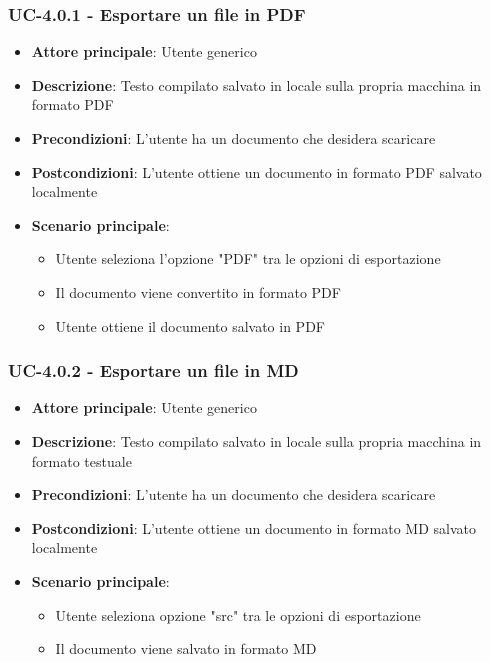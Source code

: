 \documentclass[11pt,a4paper]{article}
\begin{document}
\subsubsection{UC-4.0.1 - Esportare un file in PDF}
\begin{itemize}
    \item \textbf{Attore principale}: Utente generico
    \item \textbf{Descrizione}: Testo compilato salvato in locale sulla propria macchina in formato PDF
    \item \textbf{Precondizioni}: L'utente ha un documento che desidera scaricare
    \item \textbf{Postcondizioni}: L'utente ottiene un documento in formato PDF salvato localmente
    \item \textbf{Scenario principale}:
        \begin{itemize}
            \item Utente seleziona l'opzione "PDF" tra le opzioni di esportazione
            \item Il documento viene convertito in formato PDF
            \item Utente ottiene il documento salvato in PDF
        \end{itemize}
\end{itemize}

\subsubsection{UC-4.0.2 - Esportare un file in MD}
\begin{itemize}
    \item \textbf{Attore principale}: Utente generico
    \item \textbf{Descrizione}: Testo compilato salvato in locale sulla propria macchina in formato testuale
    \item \textbf{Precondizioni}: L'utente ha un documento che desidera scaricare
    \item \textbf{Postcondizioni}: L'utente ottiene un documento in formato MD salvato localmente
    \item \textbf{Scenario principale}:
        \begin{itemize}
            \item Utente seleziona opzione "src" tra le opzioni di esportazione
            \item Il documento viene salvato in formato MD
        \end{itemize}
\end{itemize}
\end{document}
